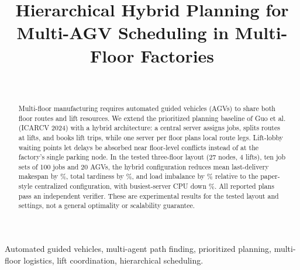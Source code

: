 \documentclass[conference]{IEEEtran}
\title{Hierarchical Hybrid Planning for Multi-AGV Scheduling in Multi-Floor Factories}
\author{\IEEEauthorblockN{Soma Datta and Pudi Kireeti}\IEEEauthorblockA{IIIT Bangalore}\\
\IEEEauthorblockA{tsvnm.krishna@iiitb.ac.in, pudi.kireeti@iiitb.ac.in}}
\begin{document}
\maketitle

\begin{abstract}
Multi-floor manufacturing requires automated guided vehicles (AGVs) to share both floor routes and lift resources. We extend the prioritized planning baseline of Guo et al. (ICARCV 2024) with a hybrid architecture: a central server assigns jobs, splits routes at lifts, and books lift trips, while one server per floor plans local route legs. Lift-lobby waiting points let delays be absorbed near floor-level conflicts instead of at the factory's single parking node. In the tested three-floor layout (27 nodes, 4 lifts), ten job sets of 100 jobs and 20 AGVs, the hybrid configuration reduces mean last-delivery makespan by \RedMakespanCAabs\%, total tardiness by \RedTardinessCAabs\%, and load imbalance by \RedImbalanceCAabs\% relative to the paper-style centralized configuration, with busiest-server CPU down \RedCpuMaxCAabs\%. All reported plans pass an independent verifier. These are experimental results for the tested layout and settings, not a general optimality or scalability guarantee.
\end{abstract}

\begin{IEEEkeywords}
Automated guided vehicles, multi-agent path finding, prioritized planning, multi-floor logistics, lift coordination, hierarchical scheduling.
\end{IEEEkeywords}








\appendices

\end{document}
